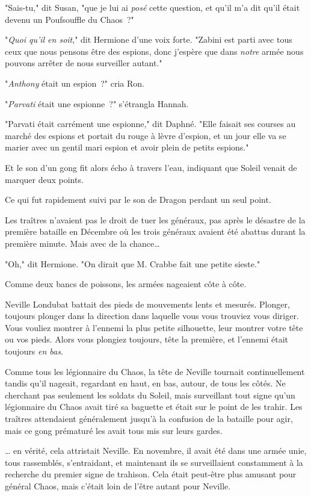 "Sais-tu," dit Susan, "que je lui ai \emph{posé} cette question, et qu'il m'a dit qu'il était devenu un Poufsouffle du Chaos~?"

"\emph{Quoi qu'il en soit}," dit Hermione d'une voix forte. "Zabini est parti avec tous ceux que nous pensons être des espions, donc j'espère que dans \emph{notre} armée nous pouvons arrêter de nous surveiller autant."

"\emph{Anthony} était un espion~?" cria Ron.

"\emph{Parvati} était une espionne~?" s'étrangla Hannah.

"Parvati était carrément une espionne," dit Daphné. "Elle faisait ses courses au marché des espions et portait du rouge à lèvre d'espion, et un jour elle va se marier avec un gentil mari espion et avoir plein de petits espions."

Et le son d'un gong fit alors écho à travers l'eau, indiquant que Soleil venait de marquer deux points.

Ce qui fut rapidement suivi par le son de Dragon perdant un seul point.

Les traîtres n'avaient pas le droit de tuer les généraux, pas après le désastre de la première bataille en Décembre où les trois généraux avaient été abattus durant la première minute. Mais avec de la chance…

"Oh," dit Hermione. "On dirait que M. Crabbe fait une petite sieste."

\later

Comme deux bancs de poissons, les armées nageaient côte à côte.

Neville Londubat battait des pieds de mouvements lents et mesurés. Plonger, toujours plonger dans la direction dans laquelle vous vous trouviez vous diriger. Vous vouliez montrer à l'ennemi la plus petite silhouette, leur montrer votre tête ou vos pieds. Alors vous plongiez toujours, tête la première, et l'ennemi était toujours \emph{en bas}.

Comme tous les légionnaire du Chaos, la tête de Neville tournait continuellement tandis qu'il nageait, regardant en haut, en bas, autour, de tous les côtés. Ne cherchant pas seulement les soldats du Soleil, mais surveillant tout signe qu'un légionnaire du Chaos avait tiré sa baguette et était sur le point de les trahir. Les traîtres attendaient généralement jusqu'à la confusion de la bataille pour agir, mais ce gong prématuré les avait tous mis sur leurs gardes.

… en vérité, cela attristait Neville. En novembre, il avait été dans une armée unie, tous rassemblés, s'entraidant, et maintenant ils se surveillaient constamment à la recherche du premier signe de trahison. Cela était peut-être plus amusant pour général Chaos, mais c'était loin de l'être autant pour Neville.

